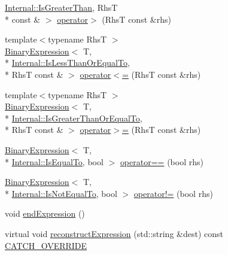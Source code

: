 \begin{DoxyCompactItemize}
\hyperlink{namespace_catch_1_1_internal_ae3f96598a7858155750bf38e7295d83eac0e8866139e99803d169595af70f6c22}{Internal\-::\-Is\-Greater\-Than}, Rhs\-T \\*
const \& $>$ \hyperlink{class_catch_1_1_expression_lhs_a52981d92ec6aad872660ae7df1abb33a}{operator$>$} (Rhs\-T const \&rhs)
\item 
{\footnotesize template$<$typename Rhs\-T $>$ }\\\hyperlink{class_catch_1_1_binary_expression}{Binary\-Expression}$<$ T, \\*
\hyperlink{namespace_catch_1_1_internal_ae3f96598a7858155750bf38e7295d83ea0db29a4c3f1e81260036c5e27a8407fd}{Internal\-::\-Is\-Less\-Than\-Or\-Equal\-To}, \\*
Rhs\-T const \& $>$ \hyperlink{class_catch_1_1_expression_lhs_a1d10974a581c67cc400cd6cdd36b0000}{operator$<$=} (Rhs\-T const \&rhs)
\item 
{\footnotesize template$<$typename Rhs\-T $>$ }\\\hyperlink{class_catch_1_1_binary_expression}{Binary\-Expression}$<$ T, \\*
\hyperlink{namespace_catch_1_1_internal_ae3f96598a7858155750bf38e7295d83ead2de7e9565e59e36c0987e402203ce1c}{Internal\-::\-Is\-Greater\-Than\-Or\-Equal\-To}, \\*
Rhs\-T const \& $>$ \hyperlink{class_catch_1_1_expression_lhs_a3387a494cb6b699a6c0162c79f7f533c}{operator$>$=} (Rhs\-T const \&rhs)
\item 
\hyperlink{class_catch_1_1_binary_expression}{Binary\-Expression}$<$ T, \\*
\hyperlink{namespace_catch_1_1_internal_ae3f96598a7858155750bf38e7295d83ea30e0accba6ec8384f4383b04dd2a6a9e}{Internal\-::\-Is\-Equal\-To}, bool $>$ \hyperlink{class_catch_1_1_expression_lhs_ab803185079504a65b0af95f7c9669351}{operator==} (bool rhs)
\item 
\hyperlink{class_catch_1_1_binary_expression}{Binary\-Expression}$<$ T, \\*
\hyperlink{namespace_catch_1_1_internal_ae3f96598a7858155750bf38e7295d83ea1e1699cf7d3dbee0908f1a123da2456d}{Internal\-::\-Is\-Not\-Equal\-To}, bool $>$ \hyperlink{class_catch_1_1_expression_lhs_a1f3ff934880623f12a4cbd9725397ccf}{operator!=} (bool rhs)
\item 
void \hyperlink{class_catch_1_1_expression_lhs_a13d2551a927790284fb5ddf1ee2c9079}{end\-Expression} ()
\item 
virtual void \hyperlink{class_catch_1_1_expression_lhs_a7684a053e8e88a4be475a536252630da}{reconstruct\-Expression} (std\-::string \&dest) const \hyperlink{catch_8hpp_a8ecdce4d3f57835f707915ae831eb847}{C\-A\-T\-C\-H\-\_\-\-O\-V\-E\-R\-R\-I\-D\-E}
\end{DoxyCompactItemize}


